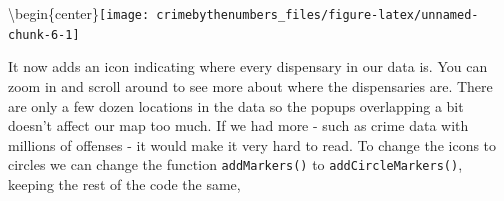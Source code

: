 \documentclass[
  12pt,
]{book}
\newenvironment{Shaded}{\begin{snugshade}}{\end{snugshade}}
\newcommand{\AttributeTok}[1]{\textcolor[rgb]{0.61,0.61,0.61}{#1}}
\newcommand{\FunctionTok}[1]{\textcolor[rgb]{0,0,0}{#1}}
\newcommand{\NormalTok}[1]{#1}
\newcommand{\SpecialCharTok}[1]{\textcolor[rgb]{0,0,0}{#1}}
\newcommand{\StringTok}[1]{\textcolor[rgb]{0.5,0.5,0.5}{#1}}
\begin{document}
\begin{Shaded}
\end{Shaded}

\textbackslash begin\{center\}\texttt{[image: crimebythenumbers\_files/figure-latex/unnamed-chunk-6-1]}

It now adds an icon indicating where every dispensary in our data is. You can zoom in and scroll around to see more about where the dispensaries are. There are only a few dozen locations in the data so the popups overlapping a bit doesn't affect our map too much. If we had more - such as crime data with millions of offenses - it would make it very hard to read. To change the icons to circles we can change the function \texttt{addMarkers()} to \texttt{addCircleMarkers()}, keeping the rest of the code the same,

\begin{Shaded}
\end{Shaded}
\end{document}

